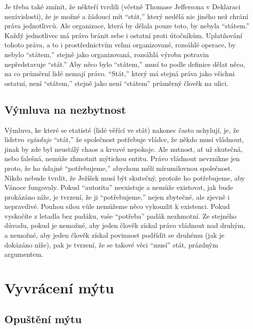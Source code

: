 \documentclass{book}
\begin{document}
Je třeba také zmínit, že někteří tvrdili (včetně Thomase Jeffersona v Deklaraci nezávislosti), že je možné a žádoucí mít \enquote{stát,} který nedělá nic jiného než chrání práva jednotlivců. Ale organizace, která by dělala pouze toto, by nebyla \enquote{státem.} Každý jednotlivec má právo bránit sebe i ostatní proti útočníkům. Uplatňování tohoto práva, a to i prostřednictvím velmi organizované, rozsáhlé operace, by nebylo \enquote{státem,} stejně jako organizovaná, rozsáhlá výroba potravin nepředstavuje \enquote{stát.} Aby něco bylo \enquote{státem,} musí to podle definice dělat něco, na co průměrní lidé nemají právo. \enquote{Stát,} který má stejná práva jako všichni ostatní, není \enquote{státem,} stejně jako není \enquote{státem} průměrný člověk na ulici.

\section{Výmluva na nezbytnost}

Výmluva, ke které se etatisté (lidé věřící ve stát) nakonec často uchylují, je, že lidstvo \emph{vyžaduje} \enquote{stát,} že společnost potřebuje vládce, že někdo musí vládnout, jinak by zde byl neustálý chaos a krvavé nepokoje. Ale nutnost, ať už skutečná, nebo falešná, nemůže zhmotnit mýtickou entitu. Právo vládnout nevznikne jen proto, že ho údajně \enquote{potřebujeme,} abychom měli mírumilovnou společnost. Nikdo nebude tvrdit, že Ježíšek musí být skutečný, protože ho potřebujeme, aby Vánoce fungovaly. Pokud \enquote{autorita} neexistuje a nemůže existovat, jak bude prokázáno níže, je tvrzení, že ji \enquote{potřebujeme,} nejen zbytečné, ale zjevně i nepravdivé. Pouhou silou vůle nemůžeme něco vykouzlit k existenci. Pokud vyskočíte z letadla bez padáku, vaše \enquote{potřeba} padák nezhmotní. Ze stejného důvodu, pokud je nemožné, aby jeden člověk získal právo vládnout nad druhým, a nemožné, aby jeden člověk získal povinnost podřídit se druhému (jak je dokázáno níže), pak je tvrzení, že se takové věci \enquote{musí} stát, prázdným argumentem.

\chapter{Vyvrácení mýtu}

\section{Opuštění mýtu}
\end{document}
